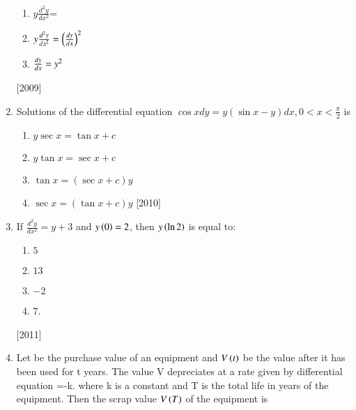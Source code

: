 \documentclass[journal]{IEEEtran}
\begin{document}
\begin{enumerate}
\begin{multicols}{2}
\begin{enumerate}
    \item $y\frac{d^{2}y}{dx^{2}}$= 

    \item $y\frac{d^{2}y}{dx^{2}}=\left(\frac{d{y}}{d{x}}\right)^2$
    
    \item $\frac{d{y}}{d{x}}=y^2$
 \end{enumerate}
\end{multicols}
\hfill
{[2009]}
\item Solutions of the differential equation $\cos{x} d{y}=y(\sin{x}-y)d{x},0<x<\frac{\pi}{2}$ is
\begin{multicols}{2}
 \begin{enumerate}
    
    \item $ y\sec{x}=\tan{x}+c$
    \item $y\tan{x}=\sec{x}+c$
    \item $\tan{x}=(\sec{x}+c)y$
    \item $\sec{x}=(\tan{x}+c)y$
\hfill
{{[2010]}}




    
 \end{enumerate}
\end{multicols}

\item If $\frac{d^{2}y}{dx^{2}}=y+3$ and $y\left(0\right)=2$, then $y\left(\ln{2}\right)$ is equal to:
\begin{multicols}{2}
 \begin{enumerate}
    \item $ 5 $
    \item $ 13 $
    \item $ -2 $
    \item $ 7 $.
 \end {enumerate}
\end{multicols}
\hfill
{{[2011]}}



\item Let be the purchase value of an equipment and $V\left(t\right)$ be the value after it has been used for t years. The value V depreciates at a rate given by differential equation =-k. where k is a constant and T is the total life in years of the equipment. Then the scrap value $V\left(T\right)$ of the equipment is 
\begin{multicols}{2}
 \begin {enumerate}


\end{enumerate}
\end{multicols}
\end{enumerate}
\end{document}
